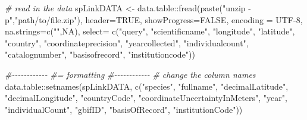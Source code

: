 \documentclass[
]{article}
\newenvironment{Shaded}{\begin{snugshade}}{\end{snugshade}}
\newcommand{\AttributeTok}[1]{\textcolor[rgb]{0.77,0.63,0.00}{#1}}
\newcommand{\CommentTok}[1]{\textcolor[rgb]{0.56,0.35,0.01}{\textit{#1}}}
\newcommand{\ConstantTok}[1]{\textcolor[rgb]{0.00,0.00,0.00}{#1}}
\newcommand{\FunctionTok}[1]{\textcolor[rgb]{0.00,0.00,0.00}{#1}}
\newcommand{\NormalTok}[1]{#1}
\newcommand{\OtherTok}[1]{\textcolor[rgb]{0.56,0.35,0.01}{#1}}
\newcommand{\SpecialCharTok}[1]{\textcolor[rgb]{0.00,0.00,0.00}{#1}}
\newcommand{\StringTok}[1]{\textcolor[rgb]{0.31,0.60,0.02}{#1}}
\begin{document}
\begin{Shaded}
\begin{Highlighting}[]

\CommentTok{\# read in the data}
\NormalTok{spLinkDATA }\OtherTok{\textless{}{-}}\NormalTok{ data.table}\SpecialCharTok{::}\FunctionTok{fread}\NormalTok{(}\FunctionTok{paste}\NormalTok{(}\StringTok{"unzip {-}p"}\NormalTok{,}\StringTok{"path/to/file.zip"}\NormalTok{),}
                                    \AttributeTok{header=}\ConstantTok{TRUE}\NormalTok{,}
                                    \AttributeTok{showProgress=}\ConstantTok{FALSE}\NormalTok{,}
                                    \AttributeTok{encoding =} \StringTok{\textquotesingle{}UTF{-}8\textquotesingle{}}\NormalTok{,}
                                    \AttributeTok{na.strings=}\FunctionTok{c}\NormalTok{(}\StringTok{""}\NormalTok{,}\ConstantTok{NA}\NormalTok{),}
                                    \AttributeTok{select=} \FunctionTok{c}\NormalTok{(}\StringTok{"query"}\NormalTok{,}
                                             \StringTok{"scientificname"}\NormalTok{,}
                                             \StringTok{"longitude"}\NormalTok{,}
                                             \StringTok{"latitude"}\NormalTok{,}
                                             \StringTok{"country"}\NormalTok{,}
                                             \StringTok{"coordinateprecision"}\NormalTok{,}
                                             \StringTok{"yearcollected"}\NormalTok{,}
                                             \StringTok{"individualcount"}\NormalTok{,}
                                             \StringTok{"catalognumber"}\NormalTok{,}
                                             \StringTok{"basisofrecord"}\NormalTok{,}
                                             \StringTok{"institutioncode"}\NormalTok{))}

\CommentTok{\#{-}{-}{-}{-}{-}{-}{-}{-}{-}{-}{-}{-}}
\CommentTok{\#= formatting}
\CommentTok{\#{-}{-}{-}{-}{-}{-}{-}{-}{-}{-}{-}{-}}
\CommentTok{\# change the column names}
\NormalTok{data.table}\SpecialCharTok{::}\FunctionTok{setnames}\NormalTok{(spLinkDATA, }
                     \FunctionTok{c}\NormalTok{(}\StringTok{"species"}\NormalTok{,}
                       \StringTok{"fullname"}\NormalTok{,}
                       \StringTok{"decimalLatitude"}\NormalTok{,}
                       \StringTok{"decimalLongitude"}\NormalTok{,}
                       \StringTok{"countryCode"}\NormalTok{,}
                       \StringTok{"coordinateUncertaintyInMeters"}\NormalTok{,}
                       \StringTok{"year"}\NormalTok{,}
                       \StringTok{"individualCount"}\NormalTok{,}
                       \StringTok{"gbifID"}\NormalTok{,}
                       \StringTok{"basisOfRecord"}\NormalTok{,}
                       \StringTok{"institutionCode"}\NormalTok{))}


\end{Highlighting}
\end{Shaded}
\end{document}
